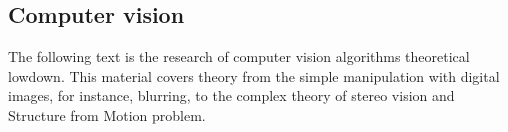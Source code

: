 \documentclass[../../../main]{subfiles}
\begin{document}
\subsection{Computer vision}

The following text is the research of computer vision algorithms theoretical lowdown. This material covers theory from the simple manipulation with digital images, for instance, blurring, to the complex theory of stereo vision and Structure from Motion problem.


\newpage


\newpage
\end{document}
